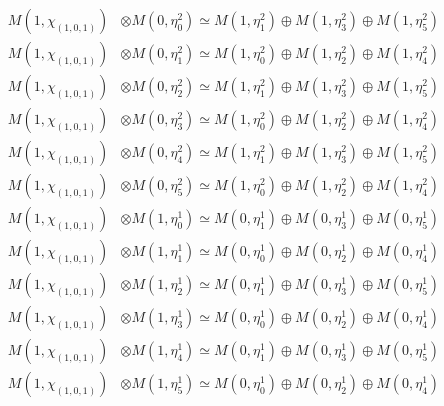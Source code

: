 \begin{align*}
M(1,\chi_{(1,0,1)}) &\otimes M(0,\eta^{2}_{0}) \simeq M(1,\eta^{2}_{1}) \oplus M(1,\eta^{2}_{3}) \oplus M(1,\eta^{2}_{5}) \\
M(1,\chi_{(1,0,1)}) &\otimes M(0,\eta^{2}_{1}) \simeq M(1,\eta^{2}_{0}) \oplus M(1,\eta^{2}_{2}) \oplus M(1,\eta^{2}_{4}) \\
M(1,\chi_{(1,0,1)}) &\otimes M(0,\eta^{2}_{2}) \simeq M(1,\eta^{2}_{1}) \oplus M(1,\eta^{2}_{3}) \oplus M(1,\eta^{2}_{5}) \\
M(1,\chi_{(1,0,1)}) &\otimes M(0,\eta^{2}_{3}) \simeq M(1,\eta^{2}_{0}) \oplus M(1,\eta^{2}_{2}) \oplus M(1,\eta^{2}_{4}) \\
M(1,\chi_{(1,0,1)}) &\otimes M(0,\eta^{2}_{4}) \simeq M(1,\eta^{2}_{1}) \oplus M(1,\eta^{2}_{3}) \oplus M(1,\eta^{2}_{5}) \\
M(1,\chi_{(1,0,1)}) &\otimes M(0,\eta^{2}_{5}) \simeq M(1,\eta^{2}_{0}) \oplus M(1,\eta^{2}_{2}) \oplus M(1,\eta^{2}_{4}) \\
M(1,\chi_{(1,0,1)}) &\otimes M(1,\eta^{1}_{0}) \simeq M(0,\eta^{1}_{1}) \oplus M(0,\eta^{1}_{3}) \oplus M(0,\eta^{1}_{5}) \\
M(1,\chi_{(1,0,1)}) &\otimes M(1,\eta^{1}_{1}) \simeq M(0,\eta^{1}_{0}) \oplus M(0,\eta^{1}_{2}) \oplus M(0,\eta^{1}_{4}) \\
M(1,\chi_{(1,0,1)}) &\otimes M(1,\eta^{1}_{2}) \simeq M(0,\eta^{1}_{1}) \oplus M(0,\eta^{1}_{3}) \oplus M(0,\eta^{1}_{5}) \\
M(1,\chi_{(1,0,1)}) &\otimes M(1,\eta^{1}_{3}) \simeq M(0,\eta^{1}_{0}) \oplus M(0,\eta^{1}_{2}) \oplus M(0,\eta^{1}_{4}) \\
M(1,\chi_{(1,0,1)}) &\otimes M(1,\eta^{1}_{4}) \simeq M(0,\eta^{1}_{1}) \oplus M(0,\eta^{1}_{3}) \oplus M(0,\eta^{1}_{5}) \\
M(1,\chi_{(1,0,1)}) &\otimes M(1,\eta^{1}_{5}) \simeq M(0,\eta^{1}_{0}) \oplus M(0,\eta^{1}_{2}) \oplus M(0,\eta^{1}_{4}) \\
\end{align*}

